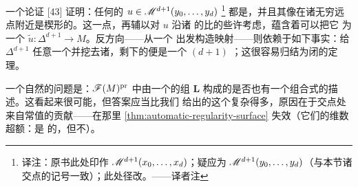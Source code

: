 一个\trIndex{}论证 [43] 证明：任何\trIsolated{}的 $u\in\mathscr{M}^{d+1}(y_0,\ldots,y_d)$%
\footnote{译注：原书此处印作 $\mathscr{M}^{d+1}(x_0,\ldots,x_d)$；疑应为%
$\mathscr{M}^{d+1}(y_0,\ldots,y_d)$（与本节诸交点的记号一致）；此处径改。——译者注}%
都是\trImmersion，并且其像在诸无穷远点附近是楔形的。这一点，再辅以对 $u$ 沿诸%
\trStriplikeEnd{}的\trConvergence{}比的些许考虑，蕴含着可以把它\trCompactification{}%
为一个\trImmersion{} $\tilde{u}\colon\Delta^{d+1}\to M$。反方向——从一个%
\trImmersion{}出发构造\trHolomorphic{}映射——则依赖于如下事实：给 $\Delta^{d+1}$%
任意一个\trComplexStructure{}并挖去诸\trCornerPoint，剩下的便是一个 $(d{+}1)$%
\trPunctured\trDisk；这很容易归结为闭\trDisk{}的\trUniformization{}定理。
\begin{remark}\label{thm:generic-collection-combinatorial}
一个自然的问题是：$\mathscr{F}(M)^{\mathrm{pr}}$ 中由一个\trGeneric{}的组 $\boldsymbol{L}$%
构成的\trFullSubcategory{}是否也有一个组合式的描述。这看起来很可能，但答案应当比我们%
给出的这个复杂得多，原因在于交点处来自常值\trHolomorphicPolygon{}的贡献——在那里%
\cref{thm:automatic-regularity-surface} 失效（它们的\trModuliSpace{}维数超额：是%
\trSmooth{}的，但不\trRegular）。
\end{remark}
